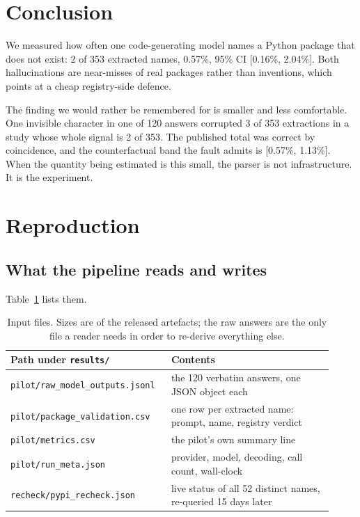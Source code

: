 \documentclass[journal]{IEEEtran}
\theoremstyle{definition}
\newcommand{\Nprompts}{120}
\newcommand{\Npkg}{353}
\newcommand{\Nhall}{2}
\newcommand{\Rate}{0.57}
\newcommand{\Ratelo}{0.16}
\newcommand{\Ratehi}{2.04}
\newcommand{\Ntrunc}{3}
\newcommand{\CFlo}{0.57}
\newcommand{\CFhi}{1.13}
\newcommand{\Recheckdays}{15}
\newcommand{\Recheckn}{52}
\begin{document}
\section{Conclusion}

We measured how often one code-generating model names a Python package that
does not exist: \Nhall{} of \Npkg{} extracted names, \Rate\%, 95\% CI
[\Ratelo\%, \Ratehi\%]. Both hallucinations are near-misses of real packages
rather than inventions, which points at a cheap registry-side defence.

The finding we would rather be remembered for is smaller and less comfortable.
One invisible character in one of \Nprompts{} answers corrupted \Ntrunc{} of
\Npkg{} extractions in a study whose whole signal is \Nhall{} of \Npkg{}. The
published total was correct by coincidence, and the counterfactual band the
fault admits is [\CFlo\%, \CFhi\%]. When the quantity being estimated is this
small, the parser is not infrastructure. It is the experiment.

\appendix

\section{Reproduction}
\label{app:repro}

\subsection{What the pipeline reads and writes}

Table~\ref{tab:inputs} lists them.

\begin{table}[h]
\caption{Input files. Sizes are of the released artefacts; the raw answers are
the only file a reader needs in order to re-derive everything else.}
\label{tab:inputs}
\centering
\small
\setlength{\tabcolsep}{4pt}
\begin{tabular}{@{}>{\raggedright\arraybackslash}p{0.44\linewidth}>{\raggedright\arraybackslash}p{0.48\linewidth}@{}}
\toprule
Path under \texttt{results/} & Contents \\
\midrule
\texttt{pilot/\allowbreak{}raw\_\allowbreak{}model\_\allowbreak{}outputs.\allowbreak{}jsonl} &
  the \Nprompts{} verbatim answers, one JSON object each \\
\texttt{pilot/\allowbreak{}package\_\allowbreak{}validation.\allowbreak{}csv} &
  one row per extracted name: prompt, name, registry verdict \\
\texttt{pilot/\allowbreak{}metrics.\allowbreak{}csv} &
  the pilot's own summary line \\
\texttt{pilot/\allowbreak{}run\_\allowbreak{}meta.\allowbreak{}json} &
  provider, model, decoding, call count, wall-clock \\
\texttt{recheck/\allowbreak{}pypi\_\allowbreak{}recheck.\allowbreak{}json} &
  live status of all \Recheckn{} distinct names, re-queried \Recheckdays{} days
  later \\
\bottomrule
\end{tabular}
\end{table}
\end{document}
